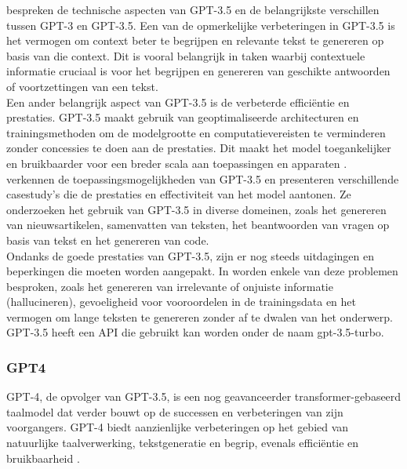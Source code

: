 \autocite{gpt_nappier} bespreken de technische aspecten van GPT-3.5 en de belangrijkste verschillen tussen GPT-3 en GPT-3.5. Een van de opmerkelijke verbeteringen in GPT-3.5 is het vermogen om context beter te begrijpen en relevante tekst te genereren op basis van die context. Dit is vooral belangrijk in taken waarbij contextuele informatie cruciaal is voor het begrijpen en genereren van geschikte antwoorden of voortzettingen van een tekst. \\

Een ander belangrijk aspect van GPT-3.5 is de verbeterde efficiëntie en prestaties. GPT-3.5 maakt gebruik van geoptimaliseerde architecturen en trainingsmethoden om de modelgrootte en computatievereisten te verminderen zonder concessies te doen aan de prestaties. Dit maakt het model toegankelijker en bruikbaarder voor een breder scala aan toepassingen en apparaten \autocite{gpt_nappier}. \\

\autocite{gpt_cn} verkennen de toepassingsmogelijkheden van GPT-3.5 en presenteren verschillende casestudy's die de prestaties en effectiviteit van het model aantonen. Ze onderzoeken het gebruik van GPT-3.5 in diverse domeinen, zoals het genereren van nieuwsartikelen, samenvatten van teksten, het beantwoorden van vragen op basis van tekst en het genereren van code. \\

Ondanks de goede prestaties van GPT-3.5, zijn er nog steeds uitdagingen en beperkingen die moeten worden aangepakt. In \autocite{gpt_cn} worden enkele van deze problemen besproken, zoals het genereren van irrelevante of onjuiste informatie (hallucineren), gevoeligheid voor vooroordelen in de trainingsdata en het vermogen om lange teksten te genereren zonder af te dwalen van het onderwerp. \\

GPT-3.5 heeft een API die gebruikt kan worden onder de naam gpt-3.5-turbo. 

\subsubsection{GPT4}
GPT-4, de opvolger van GPT-3.5, is een nog geavanceerder transformer-gebaseerd taalmodel dat verder bouwt op de successen en verbeteringen van zijn voorgangers. GPT-4 biedt aanzienlijke verbeteringen op het gebied van natuurlijke taalverwerking, tekstgeneratie en begrip, evenals efficiëntie en bruikbaarheid \autocite{gpt_openai, gpt_micai}. \\

